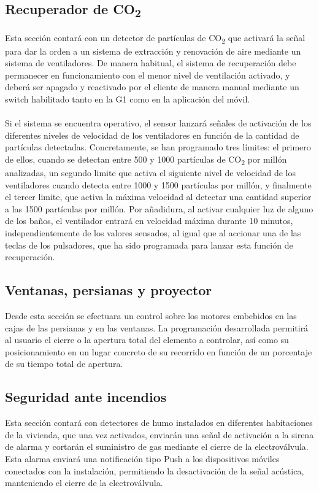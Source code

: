 \subsection{Recuperador de CO\textsubscript{2}}Esta sección contará con un detector de partículas de CO\textsubscript{2} que activará la señal para dar la orden a un sistema de extracción y renovación de aire mediante un sistema de ventiladores. De manera habitual, el sistema de recuperación debe permanecer en funcionamiento con el menor nivel de ventilación activado, y deberá ser apagado y reactivado por el cliente de manera manual mediante un switch habilitado tanto en la G1 como en la aplicación del móvil. \\\\ 
Si el sistema se encuentra operativo, el sensor lanzará señales de activación de los diferentes niveles de velocidad de los ventiladores en función de la cantidad de partículas detectadas. Concretamente, se han programado tres límites: el primero de ellos, cuando se detectan entre 500 y 1000 partículas de CO\textsubscript{2} por millón analizadas, un segundo limite que activa el siguiente nivel de velocidad de los ventiladores cuando detecta entre 1000 y 1500 partículas por millón, y finalmente el tercer limite, que activa la máxima velocidad al detectar una cantidad superior a las 1500 partículas por millón. Por añadidura, al activar cualquier luz de alguno de los baños, el ventilador entrará en velocidad máxima durante 10 minutos, independientemente de los valores sensados, al igual que al accionar una de las teclas de los pulsadores, que ha sido programada para lanzar esta función de recuperación.\\

\subsection{Ventanas, persianas y proyector}Desde esta sección se efectuara un control sobre los motores embebidos en las cajas de las persianas y en las ventanas. La programación desarrollada permitirá al usuario el cierre o la apertura total del elemento a controlar, así como su posicionamiento en un lugar concreto de su recorrido en función de un porcentaje de su tiempo total de apertura.\\
\subsection{Seguridad ante incendios }Esta sección contará con detectores de humo instalados en diferentes habitaciones de la vivienda, que una vez activados, enviarán una señal de activación a la sirena de alarma y cortarán el suministro de gas mediante el cierre de la electroválvula. Esta alarma enviará una notificación tipo Push a los dispositivos móviles conectados con la instalación, permitiendo la desactivación de la señal acústica, manteniendo el cierre de la electroválvula.\\

